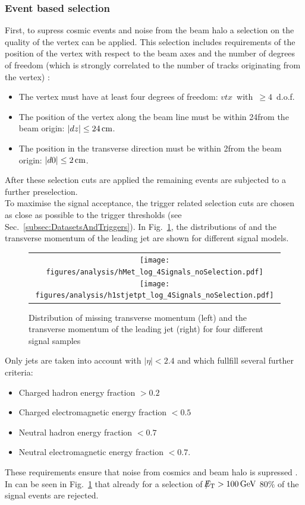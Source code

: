 \subsubsection*{Event based selection}
First, to supress cosmic events and noise from the beam halo a selection on the quality of the vertex can be applied.
This selection includes requirements of the position of the vertex with respect to the beam axes and the number of degrees of freedom (which is strongly correlated to the number of tracks originating from the vertex) \cite{bib:CMS:Tracking_7TeV_PAS}:  
\begin{itemize}
\renewcommand{\labelitemi}{\footnotesize{\ding{118}}}
\item The vertex must have at least four degrees of freedom: \mbox{$vtx$ with $\geq 4$ d.o.f.}
\item The position of the vertex along the beam line must be within 24\cm from the beam origin: \mbox{$|dz| \leq 24\,\text{cm}$.}
\item The position in the transverse direction must be within 2\cm from the beam origin: \mbox{$|d0| \leq 2\,\text{cm}$.}
\end{itemize}
After these selection cuts are applied the remaining events are subjected to a further preselection.\\


To maximise the signal acceptance, the trigger related selection cuts are chosen as close as possible to the trigger thresholds (see Sec.~\ref{subsec:DatasetsAndTriggers}).
In Fig.~\ref{fig:SignalMET+SignalJetPt}, the distributions of \met and the transverse momentum of the leading jet \ptfirstjet are shown for different signal models.
\begin{figure}[!b]
  \centering 
  \begin{tabular}{c}
    \texttt{[image: figures/analysis/hMet\_log\_4Signals\_noSelection.pdf]}
    \texttt{[image: figures/analysis/h1stjetpt\_log\_4Signals\_noSelection.pdf]}
  \end{tabular}
  \caption{Distribution of missing transverse momentum (left) and the transverse momentum of the leading jet (right) for four different signal samples}
  \label{fig:SignalMET+SignalJetPt}
\end{figure}
Only jets are taken into account with $|\eta|<2.4$ and which fullfill several further criteria:
\begin{itemize}
\item Charged hadron energy fraction $>0.2$
\item Charged electromagnetic energy fraction $<0.5$
\item Neutral hadron energy fraction $<0.7$
\item Neutral electromagnetic energy fraction $<0.7$.
\end{itemize}
These requirements ensure that noise from cosmics and beam halo is supressed \cite{bib:CMS:DM_8TeV_AN}.
In can be seen in Fig.~\ref{fig:SignalMET+SignalJetPt} that already for a selection of $\slash\mkern-12mu{E}_{\text{T}}>100\,\text{Ge}\kern-0.06667em\text{V}$ 80\% of the signal events are rejected.

